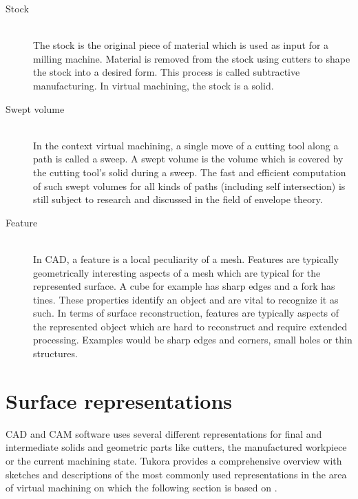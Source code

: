 \begin{description}
	
	\item[Stock] \hfill \\
	The stock is the original piece of material which is used as input for a milling machine.
	Material is removed from the stock using cutters to shape the stock into a desired form.
	This process is called subtractive manufacturing.
	In virtual machining, the stock is a solid.
	
	
	\item[Swept volume] \hfill \\
	In the context virtual machining, a single move of a cutting tool along a path is called a sweep.
	A swept volume is the volume which is covered by the cutting tool's solid during a sweep.
	The fast and efficient computation of such swept volumes for all kinds of paths (including self intersection) is still subject to research and discussed in the field of envelope theory.
	
	
	\item[Feature] \hfill \\
	In CAD, a feature is a local peculiarity of a mesh.
	Features are typically geometrically interesting aspects of a mesh which are typical for the represented surface.
	A cube for example has sharp edges and a fork has tines.
	These properties identify an object and are vital to recognize it as such.
	In terms of surface reconstruction, features are typically aspects of the represented object which are hard to reconstruct and require extended processing.
	Examples would be sharp edges and corners, small holes or thin structures.
	
\end{description}

\section{Surface representations}
\label{sec:surface_representations}

CAD and CAM software uses several different representations for final and intermediate solids and geometric parts like cutters, the manufactured workpiece or the current machining state.
Tukora provides a comprehensive overview with sketches and descriptions of the most commonly used representations in the area of virtual machining on which the following section is based on \cite{virtual_machining_review}. 

